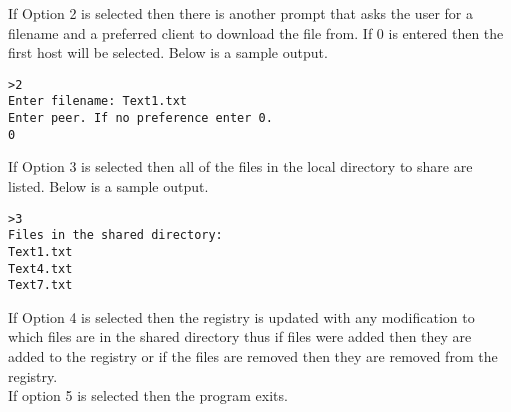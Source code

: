 \documentclass{article}
\begin{document}
If Option 2 is selected then there is another prompt that asks the user for a filename and a preferred client to download the file from. If 0 is entered then the first host will be selected. Below is a sample output.

\begin{verbatim}
>2
Enter filename: Text1.txt
Enter peer. If no preference enter 0.
0
\end{verbatim}

If Option 3 is selected then all of the files in the local directory to share are listed. Below is a sample output. 

\begin{verbatim}
>3
Files in the shared directory:
Text1.txt
Text4.txt
Text7.txt
\end{verbatim}

If Option 4 is selected then the registry is updated with any modification to which files are in the shared directory thus if files were added then they are added to the registry or if the files are removed then they are removed from the registry. \\

If option 5 is selected then the program exits. 
\end{document}
